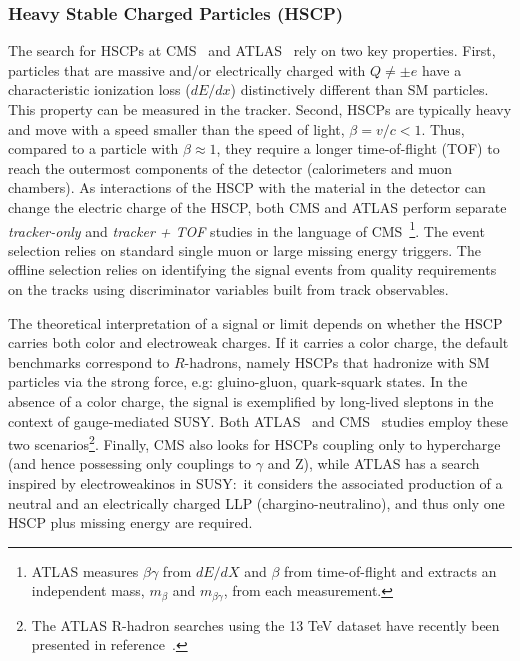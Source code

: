 \subsubsection{Heavy Stable Charged Particles (HSCP)}
\label{subsec:ExpHSCP}

The search for HSCPs at CMS~\cite{Chatrchyan:2013oca,CMS:2016ybj} and ATLAS~\cite{ATLAS:2014fka,Aaboud:2016uth} rely on two key properties. First, particles that are massive and/or electrically charged with $Q \ne \pm e$ have a  characteristic ionization loss ($dE/dx$) distinctively different than SM particles. This property can be measured in the tracker.
Second, HSCPs are typically heavy and move with a speed smaller than the speed of light, $\beta = v/c < 1$. Thus, compared to a particle with $\beta \approx 1$, they require a longer time-of-flight (TOF) to reach the outermost components of the detector (calorimeters and muon chambers).  As interactions of the HSCP with the material in the detector can change the electric charge of the HSCP, both CMS and ATLAS perform separate \emph{tracker-only} and \emph{tracker + TOF} studies in the language of CMS~\footnote{ATLAS measures $\beta \gamma$ from $dE/dX$ and $\beta$ from time-of-flight and extracts an independent mass, $m_{\beta}$ and $m_{\beta \gamma}$, from each measurement.}. The event selection relies on standard single muon or large missing energy triggers. The offline selection relies on identifying the signal events from quality requirements on the tracks using discriminator variables built from track observables.

The theoretical interpretation of a signal or limit depends on whether the HSCP carries both color and electroweak charges. If it carries a color charge, the default benchmarks correspond to $R$-hadrons, namely HSCPs that hadronize with SM particles via the strong force, e.g: gluino-gluon, quark-squark states. In the absence of a color charge, the signal is exemplified by long-lived sleptons in the context of gauge-mediated SUSY. Both ATLAS~\cite{ATLAS:2014fka} and CMS~\cite{CMS:2016ybj} studies employ these two scenarios\footnote{The ATLAS R-hadron searches using the 13 TeV dataset have recently been presented in reference~\cite{Aaboud:2016uth}. }.
Finally, CMS also looks for HSCPs coupling only to hypercharge (and hence possessing only couplings to $\gamma$ and Z), while ATLAS has a search inspired by electroweakinos in SUSY:~it considers the associated production of a neutral and an electrically charged LLP (chargino-neutralino), and thus only one HSCP plus missing energy are required.

